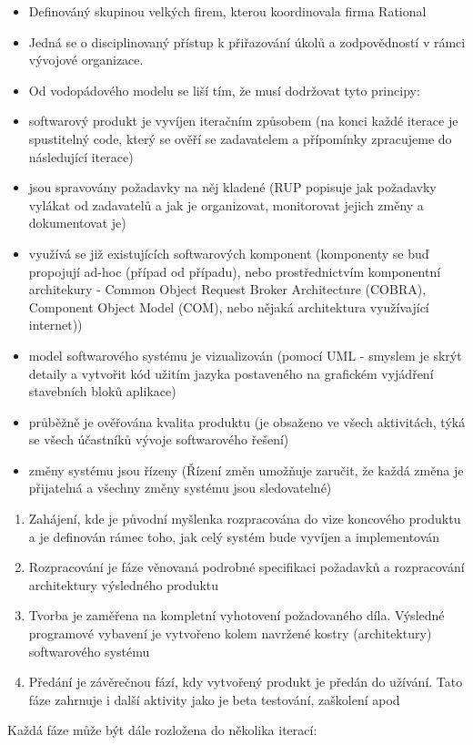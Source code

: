 \documentclass[10pt,a4paper]{article}
\begin{document}
\begin{itemize}
\item Definováný skupinou velkých firem, kterou koordinovala firma Rational
\item Jedná se o disciplinovaný přístup k přiřazování úkolů a zodpovědností v rámci vývojové organizace.
\item Od vodopádového modelu se liší tím, že musí dodržovat tyto principy:
\item softwarový produkt je vyvíjen iteračním způsobem (na konci každé iterace je spustitelný code, který se ověří se zadavatelem a přípomínky zpracujeme do následující iterace)
\item jsou spravovány požadavky na něj kladené (RUP popisuje jak požadavky vylákat od zadavatelů a jak je organizovat, monitorovat jejich změny a dokumentovat je)
\item využívá se již existujících softwarových komponent (komponenty se buď propojují ad-hoc (případ od případu), nebo prostřednictvím komponentní architekury - Common Object Request Broker Architecture (COBRA), Component Object Model (COM), nebo nějaká architektura využívající internet))
\item model softwarového systému je vizualizován (pomocí UML - smyslem je skrýt detaily a vytvořit kód užitím jazyka postaveného na grafickém vyjádření stavebních bloků aplikace)
\item průběžně je ověřována kvalita produktu (je obsaženo ve všech aktivitách, týká se všech účastníků vývoje softwarového řešení)
\item změny systému jsou řízeny (Řízení změn umožňuje zaručit, že každá změna je přijatelná a všechny změny systému jsou sledovatelné)
\end{itemize}

\begin{enumerate}
\item Zahájení, kde je původní myšlenka rozpracována do vize koncového produktu a je definován rámec toho, jak celý systém bude vyvíjen a implementován
\item Rozpracování je fáze věnovaná podrobné specifikaci požadavků a rozpracování architektury výsledného produktu
\item Tvorba je zaměřena na kompletní vyhotovení požadovaného díla. Výsledné programové vybavení je vytvořeno kolem navržené kostry (architektury) softwarového systému
\item Předání je závěrečnou fází, kdy vytvořený produkt je předán do užívání. Tato fáze zahrnuje i další aktivity jako je beta testování, zaškolení apod
\end{enumerate}
Každá fáze může být dále rozložena do několika iterací:
\end{document}
